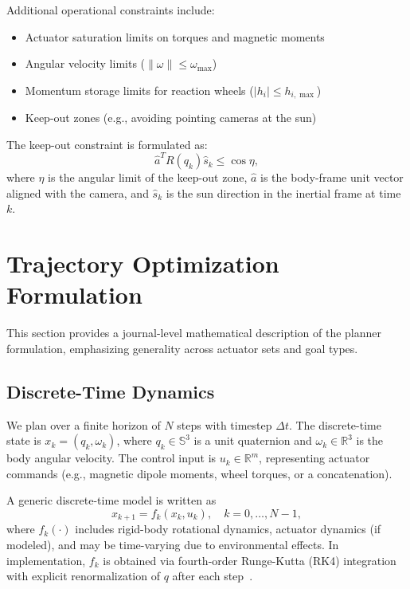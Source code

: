 \documentclass[conference]{IEEEtran}
\begin{document}
Additional operational constraints include:
\begin{itemize}
    \item Actuator saturation limits on torques and magnetic moments
    \item Angular velocity limits ($\|\omega\| \leq \omega_{\max}$)
    \item Momentum storage limits for reaction wheels ($|h_i| \leq h_{i,\max}$)
    \item Keep-out zones (e.g., avoiding pointing cameras at the sun)
\end{itemize}

The keep-out constraint is formulated as:
\begin{equation}\label{eq:keepout}
    \hat{a}^T R(q_k) \hat{s}_k \leq \cos\eta,
\end{equation}
where $\eta$ is the angular limit of the keep-out zone, $\hat{a}$ is the body-frame unit vector aligned with the camera, and $\hat{s}_k$ is the sun direction in the inertial frame at time $k$.


\section{Trajectory Optimization Formulation}\label{sec:jgcd_math}

This section provides a journal-level mathematical description of the planner formulation, emphasizing generality across actuator sets and goal types.

\subsection{Discrete-Time Dynamics}\label{subsec:discrete_dynamics}

We plan over a finite horizon of $N$ steps with timestep $\Delta t$. The discrete-time state is $x_k = (q_k, \omega_k)$, where $q_k \in \mathbb{S}^3$ is a unit quaternion and $\omega_k \in \mathbb{R}^3$ is the body angular velocity. The control input is $u_k \in \mathbb{R}^m$, representing actuator commands (e.g., magnetic dipole moments, wheel torques, or a concatenation).

A generic discrete-time model is written as
\begin{equation}\label{eq:discrete_dynamics}
    x_{k+1} = f_k(x_k, u_k), \quad k = 0,\dots,N-1,
\end{equation}
where $f_k(\cdot)$ includes rigid-body rotational dynamics, actuator dynamics (if modeled), and may be time-varying due to environmental effects. In implementation, $f_k$ is obtained via fourth-order Runge-Kutta (RK4) integration with explicit renormalization of $q$ after each step~\cite{sveier_applied_2019}.
\end{document}
